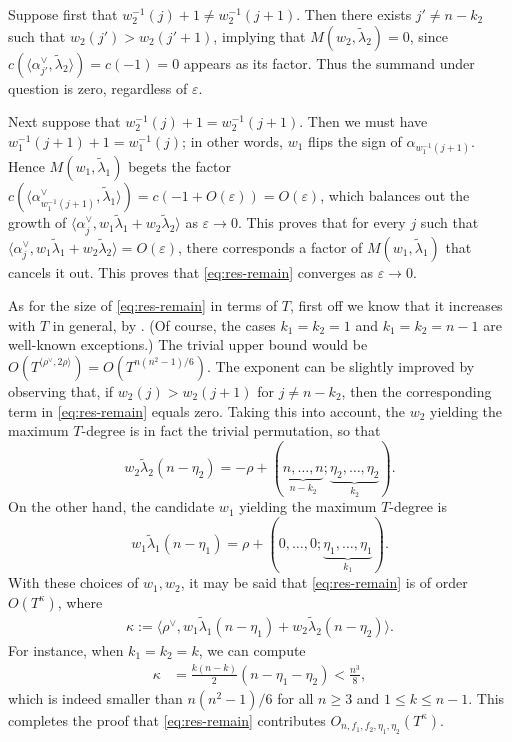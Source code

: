 \documentclass[11pt]{amsart}
\numberwithin{theorem}{section}
\numberwithin{equation}{section}
\theoremstyle{remark}
\theoremstyle{definition}
\newcommand{\re}{\mathrm{Re}\,}
\begin{document}
Suppose first that $w_2^{-1}(j) + 1 \neq w_2^{-1}(j+1)$.
Then there exists $j' \neq n-k_2$ such that $w_2(j') > w_2(j'+1)$, implying that $M(w_2,\tilde\lambda_2)=0$, since $c(\langle \alpha^\vee_{j'},\tilde\lambda_2\rangle) = c(-1) = 0$ appears as its factor. Thus the summand under question is zero, regardless of $\varepsilon$.

Next suppose that $w_2^{-1}(j) + 1 = w_2^{-1}(j+1)$. Then we must have $w_1^{-1}(j+1) +1 = w_1^{-1}(j)$; in other words, $w_1$ flips the sign of $\alpha_{w_1^{-1}(j+1)}$. Hence $M(w_1,\tilde\lambda_1)$ begets the factor $c(\langle \alpha^\vee_{w_1^{-1}(j+1)},\tilde\lambda_1\rangle) = c(-1+O(\varepsilon)) = O(\varepsilon)$, which balances out the growth of $\langle \alpha^\vee_j, w_1\tilde\lambda_1 + w_2\tilde\lambda_2 \rangle$ as $\varepsilon \rightarrow 0$. This proves that for every $j$ such that $\langle \alpha^\vee_j, w_1\tilde\lambda_1 + w_2\tilde\lambda_2 \rangle = O(\varepsilon)$, there corresponds a factor of $M(w_1,\tilde\lambda_1)$ that cancels it out. This proves that \eqref{eq:res-remain} converges as $\varepsilon \rightarrow 0$.

As for the size of \eqref{eq:res-remain} in terms of $T$, first off we know that it increases with $T$ in general, by \cite[Corollary to Theorem 4]{Kim22}. (Of course, the cases $k_1=k_2=1$ and $k_1=k_2=n-1$ are well-known exceptions.) The trivial upper bound would be $O(T^{\langle \rho^\vee,2\rho\rangle}) = O(T^{n(n^2-1)/6})$. The exponent can be slightly improved by observing that, if $w_2(j) > w_2(j+1)$ for $j\neq n-k_2$, then the corresponding term in \eqref{eq:res-remain} equals zero. Taking this into account, the $w_2$ yielding the maximum $T$-degree is in fact the trivial permutation, so that
\begin{equation*}
w_2\tilde\lambda_2(n-\eta_2) = -\rho + (\underbrace{n,\ldots,n}_{n-k_2};\underbrace{\eta_2,\ldots,\eta_2}_{k_2}).
\end{equation*}
On the other hand, the candidate $w_1$ yielding the maximum $T$-degree is
\begin{equation*}
w_1\tilde\lambda_1(n-\eta_1) = \rho + (0,\ldots,0;\underbrace{\eta_1,\ldots,\eta_1}_{k_1}).
\end{equation*}
With these choices of $w_1,w_2$, it may be said that \eqref{eq:res-remain} is of order $O(T^{\kappa})$, where
\begin{align*}
\kappa := \langle \rho^\vee, w_1\tilde\lambda_1(n-\eta_1)+w_2\tilde\lambda_2(n-\eta_2)\rangle.
\end{align*}
For instance, when $k_1=k_2=k$, we can compute
\begin{align*}
\kappa &= \frac{k(n-k)}{2}(n-\eta_1-\eta_2) < \frac{n^3}{8},
\end{align*}
which is indeed smaller than $n(n^2-1)/6$ for all $n \geq 3$ and $1 \leq k \leq n-1$. This completes the proof that \eqref{eq:res-remain} contributes $O_{n,f_1,f_2,\eta_1,\eta_2}\left(T^\kappa\right)$.
\end{document}
